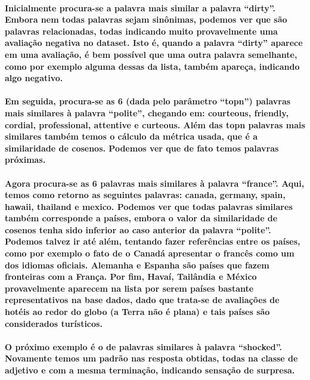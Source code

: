 \documentclass[a4paper]{article}    %
\begin{document}
\paragraph{Inicialmente procura-se a palavra mais similar a palavra ``dirty''. Embora nem todas palavras sejam sinônimas, podemos ver que são palavras relacionadas, todas indicando muito provavelmente uma avaliação negativa no dataset. Isto é, quando a palavra ``dirty'' aparece em uma avaliação, é bem possível que uma outra palavra semelhante, como por exemplo alguma dessas da lista, também apareça, indicando algo negativo.}

\paragraph{Em seguida, procura-se as 6 (dada pelo parâmetro ``topn'') palavras mais similares à palavra ``polite'', chegando em: courteous, friendly, cordial, professional, attentive e curteous. Além das topn palavras mais similares também temos o cálculo da métrica usada, que é a similaridade de cosenos. Podemos ver que de fato temos palavras próximas.}

\paragraph{Agora procura-se as 6 palavras mais similares à palavra ``france''. Aqui, temos como retorno as seguintes palavras: canada, germany, spain, hawaii, thailand e mexico. Podemos ver que todas palavras similares também corresponde a países, embora o valor da similaridade de cosenos tenha sido inferior ao caso anterior da palavra ``polite''. Podemos talvez ir até além, tentando fazer referências entre os países, como por exemplo o fato de o Canadá apresentar o francês como um dos idiomas oficiais. Alemanha e Espanha são países que fazem fronteiras com a França. Por fim, Havaí, Tailândia e México provavelmente aparecem na lista por serem países bastante representativos na base dados, dado que trata-se de avaliações de hotéis ao redor do globo (a Terra não é plana) e tais países são considerados turísticos.}

\paragraph{O próximo exemplo é o de palavras similares à palavra ``shocked''. Novamente temos um padrão nas resposta obtidas, todas na classe de adjetivo e com a mesma terminação, indicando sensação de surpresa.}
\end{document}
